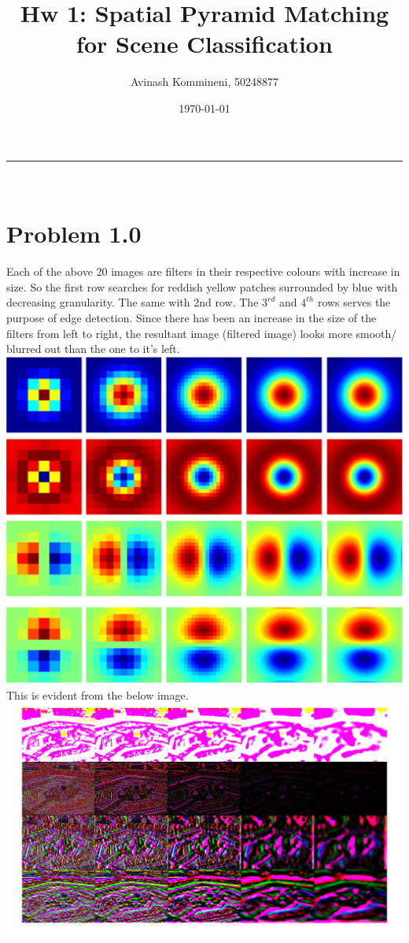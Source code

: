 \documentclass[a4paper,11pt]{article}
\makeatletter
\newcommand{\linia}{\rule{\linewidth}{0.5pt}}
\renewcommand{\maketitle}{
\begin{center}
\vspace{1ex}
{\LARGE \textsc{\@title}}
\vspace{0.5ex}
\linia\\
\@author \hfill \@date
\vspace{3ex}
\end{center}
}
\makeatother
\begin{document}
\title{Hw 1: Spatial Pyramid Matching for Scene Classification}

\author{Avinash Kommineni, 50248877} 
\date{\today}

\maketitle

\section*{Problem 1.0}

Each of the above 20 images are filters in their respective colours with increase in size. So the first row searches for reddish yellow patches surrounded by blue with decreasing granularity. The same with 2nd row. The $3^{rd}$ and $4^{th}$ rows serves the purpose of edge detection. Since there has been an increase in the size of the filters from left to right, the resultant image (filtered  image) looks more smooth/ blurred out than the one to it's left. \\
\includegraphics[width=\textwidth]{filters}\\
This is evident from the below image.\\
\includegraphics[width=\textwidth]{Montage1}
\end{document}
